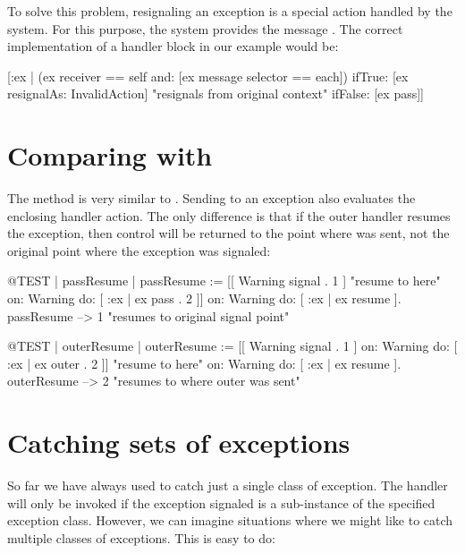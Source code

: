 \documentclass[a4paper,10pt,twoside]{book}
\begin{document}
To solve this problem, resignaling an exception is a special action handled by the system. For this purpose, the system provides the message . The correct implementation of a handler block in our  example would be:

\begin{code}{}
 [:ex |  (ex receiver == self and: [ex message selector == each])
	ifTrue: [ex resignalAs: InvalidAction]    "resignals from original context"
	ifFalse: [ex pass]]
\end{code}

\section{Comparing  with }

The method  is very similar to . Sending  to an exception also evaluates the enclosing handler action. The only difference is that if the outer handler resumes the exception, then control will be returned to the point where  was sent, not the original point where the exception was signaled:

\begin{code}{@TEST | passResume |}
passResume := [[ Warning signal . 1 ]    "resume to here"
	on: Warning
	do: [ :ex | ex pass . 2 ]]
		on: Warning
		do: [ :ex | ex resume ].
passResume --> 1    "resumes to original signal point"
\end{code}

\begin{code}{@TEST | outerResume |}
outerResume := [[ Warning signal . 1 ]
	on: Warning
	do: [ :ex | ex outer . 2 ]]    "resume to here"
		on: Warning
		do: [ :ex | ex resume ].
outerResume --> 2    "resumes to where outer was sent"
\end{code}

\section{Catching sets of exceptions}

So far we have always used  to catch just a single class of exception. The handler will only be invoked if the exception signaled is a sub-instance of the specified exception class.
However, we can imagine situations where we might like to catch multiple classes of exceptions. This is easy to do:
\end{document}
